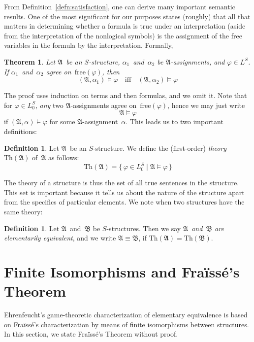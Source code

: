 \documentclass[letterpaper]{article}
\newcommand{\A}{\mathfrak{A}}
\newcommand{\B}{\mathfrak{B}}
\newcommand{\free}{\mathrm{free}}
\newcommand{\thr}{\mathrm{Th}}
\newcommand{\ef}{Ehrenfeucht}
\newcommand{\fr}{Fra\"iss\'e}
\numberwithin{equation}{section}
\theoremstyle{plain}
\newtheorem{thm}[equation]{Theorem}
\theoremstyle{definition}
\newtheorem{defn}[equation]{Definition}
\begin{document}
From Definition~\ref{defn:satisfaction}, one can derive many important semantic results. One of the most significant for our purposes states (roughly) that all that matters in determining whether a formula is true under an interpretation (aside from the interpretation of the nonlogical symbols) is the assignment of the free variables in the formula by the interpretation. Formally,
\begin{thm}
Let $\A$~be an $S$-structure, $\alpha_1$~and~$\alpha_2$ be $\A$-assignments, and $\varphi\in L^S$. If $\alpha_1$~and~$\alpha_2$ agree on~$\free(\varphi)$, then
$$(\A,\alpha_1)\models\varphi\quad\text{iff}\quad(\A,\alpha_2)\models\varphi$$
\end{thm}
\noindent The proof uses induction on terms and then formulas, and we omit it. Note that for $\varphi\in L_0^S$, \emph{any} two $\A$-assignments agree on~$\free(\varphi)$, hence we may just write
$$\A\models\varphi$$
if $(\A,\alpha)\models\varphi$ for some $\A$-assignment~$\alpha$. This leads us to two important definitions:
\begin{defn}
Let $\A$~be an $S$-structure. We define the (first-order) \emph{theory~$\thr(\A)$} of~$\A$ as follows:
$$\thr(\A)=\{\,\varphi\in L_0^S\mid \A\models\varphi\,\}$$
\end{defn}
\noindent The theory of a structure is thus the set of all true sentences in the structure. This set is important because it tells us about the nature of the structure apart from the specifics of particular elements. We note when two structures have the same theory:
\begin{defn}
Let $\A$~and~$\B$ be $S$-structures. Then we say \emph{$\A$~and~$\B$ are elementarily equivalent}, and we write $\A\equiv\B$, if $\thr(\A)=\thr(\B)$.
\end{defn}

\section{Finite Isomorphisms and \fr's Theorem}
\noindent \ef's game-theoretic characterization of elementary equivalence is based on \fr's characterization by means of finite isomorphisms between structures. In this section, we state \fr's Theorem without proof.
\end{document}
